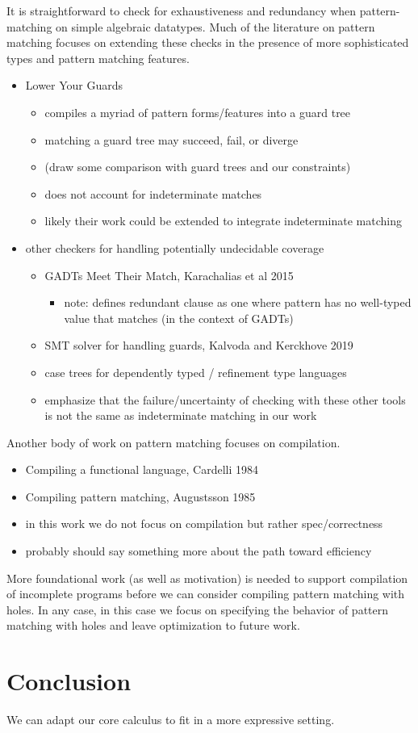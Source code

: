 \documentclass[runningheads,envcountsame,a4paper]{llncs}
\begin{document}
It is straightforward to check for exhaustiveness and redundancy when pattern-matching on
simple algebraic datatypes.
Much of the literature on pattern matching focuses on extending these checks in the presence of
more sophisticated types and pattern matching features.
\begin{itemize}
    \item Lower Your Guards
    \begin{itemize}
        \item compiles a myriad of pattern forms/features into a guard tree
        \item matching a guard tree may succeed, fail, or diverge
        \item (draw some comparison with guard trees and our constraints)
        \item does not account for indeterminate matches
        \item likely their work could be extended to integrate indeterminate matching
    \end{itemize}
    \item other checkers for handling potentially undecidable coverage
    \begin{itemize}
        \item GADTs Meet Their Match, Karachalias et al 2015
        \begin{itemize}
            \item note: defines redundant clause as one where pattern has no well-typed
            value that matches (in the context of GADTs)
        \end{itemize}
        \item SMT solver for handling guards, Kalvoda and Kerckhove 2019
        \item case trees for dependently typed / refinement type languages
        \item emphasize that the failure/uncertainty of checking with these
        other tools is not the same as indeterminate matching in our work
    \end{itemize}
\end{itemize}

Another body of work on pattern matching focuses on compilation.
\begin{itemize}
    \item Compiling a functional language, Cardelli 1984
    \item Compiling pattern matching, Augustsson 1985
    \item in this work we do not focus on compilation but rather
    spec/correctness
    \item probably should say something more about the path toward
    efficiency
\end{itemize}
More foundational work (as well as motivation) is needed to support compilation of
incomplete programs before we can consider compiling pattern matching with holes.
In any case, in this case we focus on specifying the behavior of pattern matching
with holes and leave optimization to future work.

\section{Conclusion}
We can adapt our core calculus to fit in a more expressive setting.
\clearpage





\end{document}
